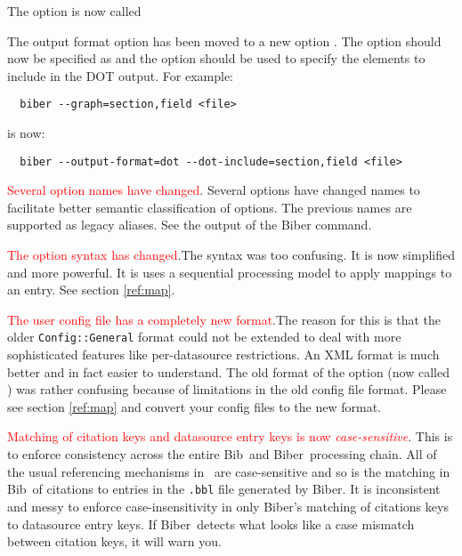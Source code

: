 \documentclass{ltxdockit}
\newcommand*{\biber}{Biber\xspace}
\begin{document}
The  option is now called 

The output format option  has been moved to a
new option . The option  should now be
specified as  and the \linebreak{} option
should be used to specify the elements to include in the DOT output. For
example:

\begin{verbatim}
  biber --graph=section,field <file>
\end{verbatim}

\noindent is now:

\begin{verbatim}
  biber --output-format=dot --dot-include=section,field <file>
\end{verbatim}

\textcolor{red}{Several option names have changed}. Several options have
changed names to facilitate better semantic classification of options. The
previous names are supported as legacy aliases. See the 
output of the \biber command.

\textcolor{red}{The  option syntax has changed}.The syntax
was too confusing. It is now simplified and more powerful. It is uses a
sequential processing model to apply mappings to an entry. See section
\ref{ref:map}.

\textcolor{red}{The user config file has a completely new format}.The
  reason for this is that the older \verb+Config::General+ format
  could not be extended to deal with more sophisticated features like
  per-datasource restrictions. An XML format is much better and in
  fact easier to understand. The old format of the  option
  (now called ) was rather confusing because
  of limitations in the old config file format. Please see section
  \ref{ref:map} and convert your config files to the new format.

\textcolor{red}{Matching of citation keys and datasource entry keys is now
  \emph{case-sensitive}}. This is to enforce consistency across the entire
Bib\latex\ and \biber\ processing chain. All of the usual referencing
mechanisms in \latex\ are case-sensitive and so is the matching in
Bib\latex\ of citations to entries in the \texttt{.bbl} file generated by
\biber. It is inconsistent and messy to enforce case-insensitivity in only
\biber's matching of citations keys to datasource entry keys. If \biber\
detects what looks like a case mismatch between citation keys, it will warn
you.
\end{document}

